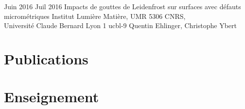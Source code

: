 \documentclass[letterpaper]{cvtemplate_fr} %
\begin{document}
\begin{cvbody}
\cvitem
	{Juin 2016}
	{Juil 2016}
	{Impacts de gouttes de Leidenfrost sur surfaces avec d\'efauts microm\'etriques}
	{Institut Lumi\`ere Mati\`ere, UMR 5306 CNRS,\\
	Universit\'e Claude Bernard Lyon 1 }
	{ucbl}{}{-9}
	{Quentin Ehlinger, Christophe Ybert}

\end{cvbody}


\section{Publications}

\begin{cvbody}

\parbox[t]{\textwidth}{

\begin{refsection}
\nocite{*}
\setlength\bibitemsep{-5pt}
\printbibliography[heading=empty]
\end{refsection}

}

\end{cvbody}


\section{Enseignement}
\end{document}
